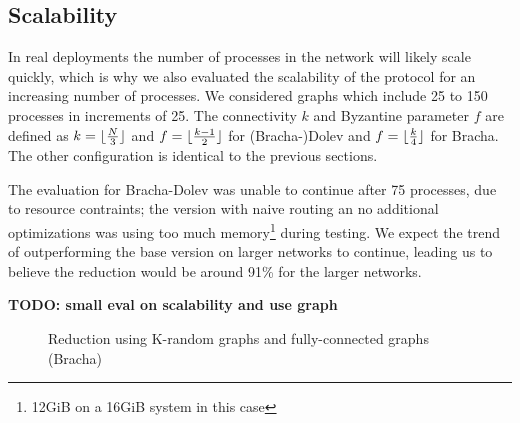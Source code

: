 \subsection{Scalability}
In real deployments the number of processes in the network will likely scale quickly, which is why we also evaluated the scalability of the protocol for an increasing number of processes. We considered graphs which include 25 to 150 processes in increments of 25. The connectivity $k$ and Byzantine parameter $f$ are defined as $k=\lfloor\frac{N}{3}\rfloor$ and $f=\lfloor\frac{k-1}{2}\rfloor$ for (Bracha-)Dolev and $f=\lfloor\frac{k}{4}\rfloor$ for Bracha. The other configuration is identical to the previous sections.

The evaluation for Bracha-Dolev was unable to continue after 75 processes, due to resource contraints; the version with naive routing an no additional optimizations was using too much memory\footnote{12GiB on a 16GiB system in this case} during testing. 
We expect the trend of outperforming the base version on larger networks to continue, leading us to believe the reduction would be around 91\% for the larger networks.

\textbf{TODO: small eval on scalability and use graph}

\begin{figure}[h]
    \centering
    
    \caption{Reduction using K-random graphs and fully-connected graphs (Bracha)}
\end{figure}

